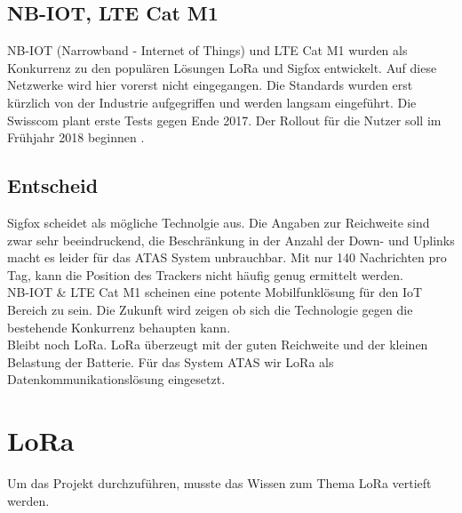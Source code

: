 \documentclass[11pt,english,german]{report}
\theoremstyle{definition}
\begin{document}
\newpage
\subsection{NB-IOT, LTE Cat M1}
NB-IOT (Narrowband - Internet of Things) und LTE Cat M1 wurden als Konkurrenz zu den populären Lösungen LoRa und Sigfox entwickelt. Auf diese Netzwerke wird hier vorerst nicht eingegangen. Die Standards wurden erst kürzlich von der Industrie aufgegriffen und werden langsam eingeführt. Die Swisscom plant erste Tests gegen Ende 2017. Der Rollout für die Nutzer soll im Frühjahr 2018 beginnen \cite{swisscomnbiot}.

\subsection{Entscheid}
Sigfox scheidet als mögliche Technolgie aus. Die Angaben zur Reichweite sind zwar sehr beeindruckend, die Beschränkung in der Anzahl der Down- und Uplinks macht es leider für das ATAS System unbrauchbar. Mit nur 140 Nachrichten pro Tag, kann die Position des Trackers nicht häufig genug ermittelt werden.\\[0.3cm]
NB-IOT \& LTE Cat M1 scheinen eine potente Mobilfunklösung für den IoT Bereich zu sein. Die Zukunft wird zeigen ob sich die Technologie gegen die bestehende Konkurrenz behaupten kann.\\[0.3cm]
Bleibt noch LoRa. LoRa überzeugt mit der guten Reichweite und der kleinen Belastung der Batterie. Für das System ATAS wir LoRa als Datenkommunikationslösung eingesetzt.

\newpage
\section{LoRa}
Um das Projekt durchzuführen, musste das Wissen zum Thema LoRa vertieft werden.
\end{document}
